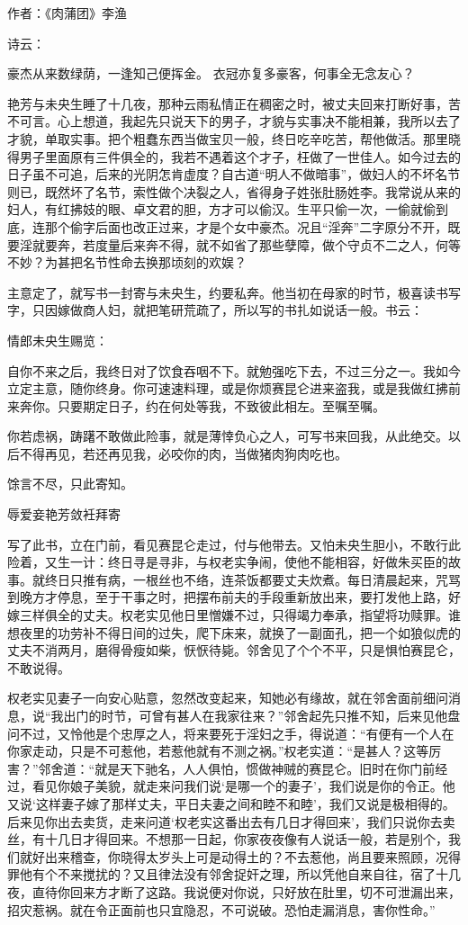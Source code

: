 \documentclass[a4paper,12pt,UTF8,twoside]{ctexbook}
\begin{document}
作者：《肉蒲团》李渔

诗云：

豪杰从来数绿荫，一逢知己便挥金。
衣冠亦复多豪客，何事全无念友心？

艳芳与未央生睡了十几夜，那种云雨私情正在稠密之时，被丈夫回来打断好事，苦不可言。心上想道，我起先只说天下的男子，才貌与实事决不能相兼，我所以去了才貌，单取实事。把个粗蠢东西当做宝贝一般，终日吃辛吃苦，帮他做活。那里晓得男子里面原有三件俱全的，我若不遇着这个才子，枉做了一世佳人。如今过去的日子虽不可追，后来的光阴怎肯虚度？自古道“明人不做暗事”，做妇人的不坏名节则已，既然坏了名节，索性做个决裂之人，省得身子姓张肚肠姓李。我常说从来的妇人，有红拂妓的眼、卓文君的胆，方才可以偷汉。生平只偷一次，一偷就偷到底，连那个偷字后面也改正过来，才是个女中豪杰。况且“淫奔”二字原分不开，既要淫就要奔，若度量后来奔不得，就不如省了那些孽障，做个守贞不二之人，何等不妙？为甚把名节性命去换那顷刻的欢娱？

主意定了，就写书一封寄与未央生，约要私奔。他当初在母家的时节，极喜读书写字，只因嫁做商人妇，就把笔研荒疏了，所以写的书扎如说话一般。书云：

情郎未央生赐览：

自你不来之后，我终日对了饮食吞咽不下。就勉强吃下去，不过三分之一。我如今立定主意，随你终身。你可速速料理，或是你烦赛昆仑进来盗我，或是我做红拂前来奔你。只要期定日子，约在何处等我，不致彼此相左。至嘱至嘱。

你若虑祸，踌躇不敢做此险事，就是薄悻负心之人，可写书来回我，从此绝交。以后不得再见，若还再见我，必咬你的肉，当做猪肉狗肉吃也。

馀言不尽，只此寄知。

辱爱妾艳芳敛衽拜寄

写了此书，立在门前，看见赛昆仑走过，付与他带去。又怕未央生胆小，不敢行此险着，又生一计：终日寻是寻非，与权老实争闹，使他不能相容，好做朱买臣的故事。就终日只推有病，一根丝也不络，连茶饭都要丈夫炊煮。每日清晨起来，咒骂到晚方才停息，至于干事之时，把摆布前夫的手段重新放出来，要打发他上路，好嫁三样俱全的丈夫。权老实见他日里憎嫌不过，只得竭力奉承，指望将功赎罪。谁想夜里的功劳补不得日间的过失，爬下床来，就换了一副面孔，把一个如狼似虎的丈夫不消两月，磨得骨瘦如柴，恹恹待毙。邻舍见了个个不平，只是惧怕赛昆仑，不敢说得。

权老实见妻子一向安心贴意，忽然改变起来，知她必有缘故，就在邻舍面前细问消息，说“我出门的时节，可曾有甚人在我家往来？”邻舍起先只推不知，后来见他盘问不过，又怜他是个忠厚之人，将来要死于淫妇之手，得说道：“有便有一个人在你家走动，只是不可惹他，若惹他就有不测之祸。”权老实道：“是甚人？这等厉害？”邻舍道：“就是天下驰名，人人俱怕，惯做神贼的赛昆仑。旧时在你门前经过，看见你娘子美貌，就走来问我们说‘是哪一个的妻子’，我们说是你的令正。他又说‘这样妻子嫁了那样丈夫，平日夫妻之间和睦不和睦’，我们又说是极相得的。后来见你出去卖货，走来问道‘权老实这番出去有几日才得回来’，我们只说你去卖丝，有十几日才得回来。不想那一日起，你家夜夜像有人说话一般，若是别个，我们就好出来稽查，你晓得太岁头上可是动得土的？不去惹他，尚且要来照顾，况得罪他有个不来搅扰的？又且律法没有邻舍捉奸之理，所以凭他自来自往，宿了十几夜，直待你回来方才断了这路。我说便对你说，只好放在肚里，切不可泄漏出来，招灾惹祸。就在令正面前也只宜隐忍，不可说破。恐怕走漏消息，害你性命。”
\end{document}
